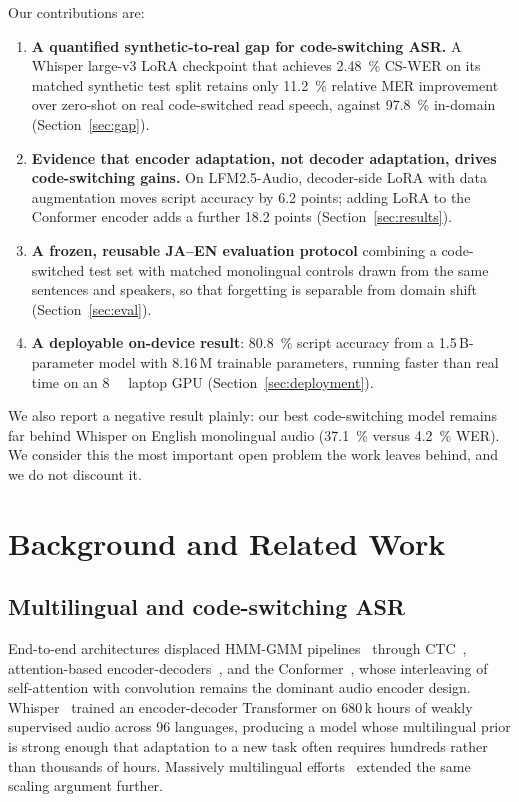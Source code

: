 \documentclass[11pt,a4paper]{article}
\begin{document}
Our contributions are:
\begin{enumerate}
  \itemsep2pt
  \item \textbf{A quantified synthetic-to-real gap for code-switching ASR.} A
    Whisper large-v3 LoRA checkpoint that achieves \SI{2.48}{\percent} CS-WER on
    its matched synthetic test split retains only \SI{11.2}{\percent} relative MER
    improvement over zero-shot on real code-switched read speech, against
    \SI{97.8}{\percent} in-domain (Section~\ref{sec:gap}).
  \item \textbf{Evidence that encoder adaptation, not decoder adaptation, drives
    code-switching gains.} On LFM2.5-Audio, decoder-side LoRA with data
    augmentation moves script accuracy by \SI{6.2}{} points; adding LoRA to the
    Conformer encoder adds a further \SI{18.2}{} points
    (Section~\ref{sec:results}).
  \item \textbf{A frozen, reusable JA--EN evaluation protocol} combining a
    code-switched test set with matched monolingual controls drawn from the same
    sentences and speakers, so that forgetting is separable from domain shift
    (Section~\ref{sec:eval}).
  \item \textbf{A deployable on-device result}: \SI{80.8}{\percent} script
    accuracy from a 1.5\,B-parameter model with
    8.16\,M trainable parameters, running faster than real time
    on an \SI{8}{\giga\byte} laptop GPU (Section~\ref{sec:deployment}).
\end{enumerate}

We also report a negative result plainly: our best code-switching model remains
far behind Whisper on English monolingual audio (\SI{37.1}{\percent} versus
\SI{4.2}{\percent} WER). We consider this the most important open problem the
work leaves behind, and we do not discount it.

\section{Background and Related Work}

\subsection{Multilingual and code-switching ASR}

End-to-end architectures displaced HMM-GMM pipelines~\cite{rabiner1989} through
CTC~\cite{graves2006ctc}, attention-based encoder-decoders~\cite{chan2015las},
and the Conformer~\cite{gulati2020conformer}, whose interleaving of self-attention
with convolution remains the dominant audio encoder design.
Whisper~\cite{radford2022whisper} trained an encoder-decoder Transformer on
680\,k hours of weakly supervised audio across 96 languages,
producing a model whose multilingual prior is strong enough that adaptation to a
new task often requires hundreds rather than thousands of hours. Massively
multilingual efforts~\cite{pratap2020mls,zhang2023usm} extended the same scaling
argument further.
\end{document}
